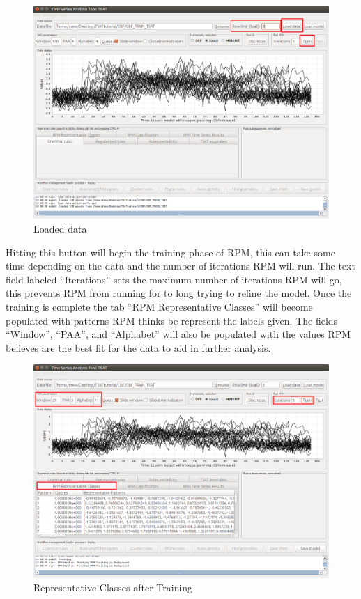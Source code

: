 \documentclass[letterpaper, 12pt]{article}
\begin{document}
\begin{figure}[H]
	\includegraphics[width=\textwidth]{TSAT-training-step-4}
	\caption{Loaded data}
	\label{fig:TSAT-training-step-4}
\end{figure}

\newpage
Hitting this button will begin the training phase of RPM, this can take some time depending on the data and the number of iterations RPM will run. The text field labeled ``Iterations'' sets the maximum number of iterations RPM will go, this prevents RPM from running for to long trying to refine the model. Once the training is complete the tab ``RPM Representative Classes'' will become populated with patterns RPM thinks be represent the labels given. The fields ``Window'', ``PAA'', and ``Alphabet'' will also be populated with the values RPM believes are the best fit for the data to aid in further analysis. 

\begin{figure}[H]
	\includegraphics[width=\textwidth]{TSAT-training-step-5}
	\caption{Representative Classes after Training}
	\label{fig:TSAT-training-step-5}
\end{figure}
\end{document}
